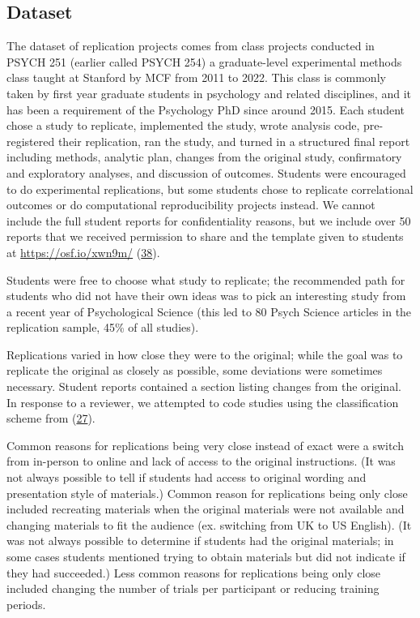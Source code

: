 \documentclass[
  english,
  a4paper,
]{article}
\begin{document}
\hypertarget{dataset}{%
\subsection{Dataset}\label{dataset}}

The dataset of replication projects comes from class projects conducted in PSYCH 251 (earlier called PSYCH 254) a graduate-level experimental methods class taught at Stanford by MCF from 2011 to 2022. This class is commonly taken by first year graduate students in psychology and related disciplines, and it has been a requirement of the Psychology PhD since around 2015. Each student chose a study to replicate, implemented the study, wrote analysis code, pre-registered their replication, ran the study, and turned in a structured final report including methods, analytic plan, changes from the original study, confirmatory and exploratory analyses, and discussion of outcomes. Students were encouraged to do experimental replications, but some students chose to replicate correlational outcomes or do computational reproducibility projects instead. We cannot include the full student reports for confidentiality reasons, but we include over 50 reports that we received permission to share and the template given to students at \url{https://osf.io/xwn9m/} (\protect\hyperlink{ref-osfdata}{38}).

Students were free to choose what study to replicate; the recommended path for students who did not have their own ideas was to pick an interesting study from a recent year of Psychological Science (this led to 80 Psych Science articles in the replication sample, 45\% of all studies).

Replications varied in how close they were to the original; while the goal was to replicate the original as closely as possible, some deviations were sometimes necessary. Student reports contained a section listing changes from the original. In response to a reviewer, we attempted to code studies using the classification scheme from (\protect\hyperlink{ref-lebel2018}{27}).

Common reasons for replications being very close instead of exact were a switch from in-person to online and lack of access to the original instructions. (It was not always possible to tell if students had access to original wording and presentation style of materials.) Common reason for replications being only close included recreating materials when the original materials were not available and changing materials to fit the audience (ex. switching from UK to US English). (It was not always possible to determine if students had the original materials; in some cases students mentioned trying to obtain materials but did not indicate if they had succeeded.) Less common reasons for replications being only close included changing the number of trials per participant or reducing training periods.
\end{document}
